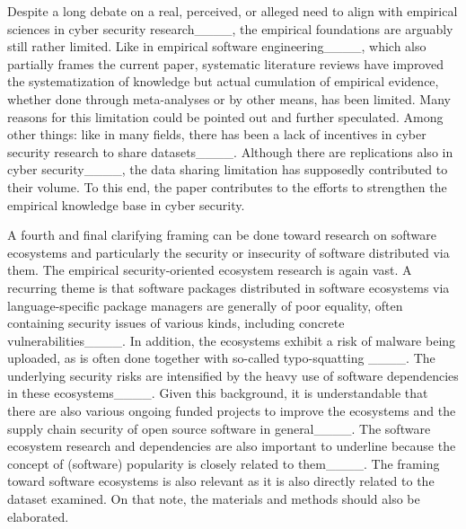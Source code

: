 Despite a long debate on a real, perceived, or alleged need to align with
empirical sciences in cyber security research____, the empirical
foundations are arguably still rather limited. Like in empirical software
engineering____, which also partially frames the current paper,
systematic literature reviews have improved the systematization of knowledge but
actual cumulation of empirical evidence, whether done through meta-analyses or
by other means, has been limited. Many reasons for this limitation could be
pointed out and further speculated. Among other things: like in many fields,
there has been a lack of incentives in cyber security research to share
datasets____. Although there are replications also in cyber
security____, the data sharing limitation has supposedly
contributed to their volume. To this end, the paper contributes to the efforts
to strengthen the empirical knowledge base in cyber security.

A fourth and final clarifying framing can be done toward research on software
ecosystems and particularly the security or insecurity of software distributed
via them. The empirical security-oriented ecosystem research is again vast. A
recurring theme is that software packages distributed in software ecosystems via
language-specific package managers are generally of poor equality, often
containing security issues of various kinds, including concrete
vulnerabilities____. In addition, the ecosystems exhibit a risk
of malware being uploaded, as is often done together with so-called
typo-squatting ____. The underlying security risks
are intensified by the heavy use of software dependencies in these
ecosystems____. Given this background, it is understandable that
there are also various ongoing funded projects to improve the ecosystems and the
supply chain security of open source software in
general____. The software ecosystem research and dependencies
are also important to underline because the concept of (software) popularity is
closely related to them____. The framing toward software
ecosystems is also relevant as it is also directly related to the dataset
examined. On that note, the materials and methods should also be elaborated.